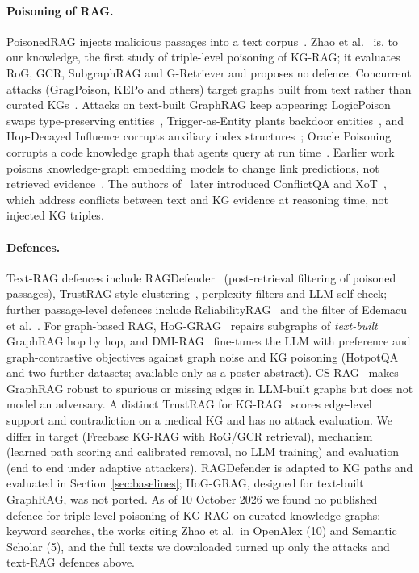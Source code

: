 \documentclass[preprint,12pt]{elsarticle}
\begin{document}
\paragraph{Poisoning of RAG.} PoisonedRAG injects malicious passages into a text corpus~\cite{zou2024}. Zhao et al.~\cite{zhao2025} is, to our knowledge, the first study of triple-level poisoning of KG-RAG; it evaluates RoG, GCR, SubgraphRAG and G-Retriever and proposes no defence. Concurrent attacks (GragPoison, KEPo and others) target graphs built from text rather than curated KGs~\cite{fewwords2025,graphragfire2026,kepo2026}. Attacks on text-built GraphRAG keep appearing: LogicPoison swaps type-preserving entities~\cite{xiao2026logic}, Trigger-as-Entity plants backdoor entities~\cite{zheng2026trigger}, and Hop-Decayed Influence corrupts auxiliary index structures~\cite{park2026hop}; Oracle Poisoning corrupts a code knowledge graph that agents query at run time~\cite{kereopa2026}. Earlier work poisons knowledge-graph embedding models to change link predictions, not retrieved evidence~\cite{banerjee2021,you2023}. The authors of~\cite{zhao2025} later introduced ConflictQA and XoT~\cite{conflictqa2026}, which address conflicts between text and KG evidence at reasoning time, not injected KG triples.

\paragraph{Defences.} Text-RAG defences include RAGDefender~\cite{kim2025} (post-retrieval filtering of poisoned passages), TrustRAG-style clustering~\cite{zhou2025trustrag}, perplexity filters and LLM self-check; further passage-level defences include ReliabilityRAG~\cite{shen2025} and the filter of Edemacu et al.~\cite{edemacu2025}. For graph-based RAG, HoG-GRAG~\cite{noughabi2026} repairs subgraphs of \emph{text-built} GraphRAG hop by hop, and DMI-RAG~\cite{fei2026} fine-tunes the LLM with preference and graph-contrastive objectives against graph noise and KG poisoning (HotpotQA and two further datasets; available only as a poster abstract). CS-RAG~\cite{ma2026csrag} makes GraphRAG robust to spurious or missing edges in LLM-built graphs but does not model an adversary. A distinct TrustRAG for KG-RAG~\cite{li2026} scores edge-level support and contradiction on a medical KG and has no attack evaluation. We differ in target (Freebase KG-RAG with RoG/GCR retrieval), mechanism (learned path scoring and calibrated removal, no LLM training) and evaluation (end to end under adaptive attackers). RAGDefender is adapted to KG paths and evaluated in Section~\ref{sec:baselines}; HoG-GRAG, designed for text-built GraphRAG, was not ported. As of 10 October 2026 we found no published defence for triple-level poisoning of KG-RAG on curated knowledge graphs: keyword searches, the works citing Zhao et al.\ in OpenAlex (10) and Semantic Scholar (5), and the full texts we downloaded turned up only the attacks and text-RAG defences above.
\end{document}
